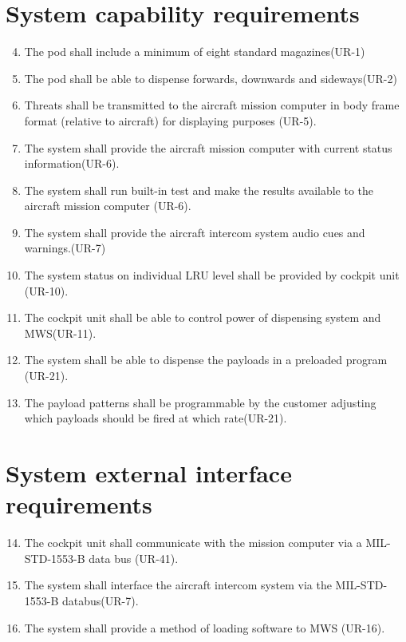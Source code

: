 \documentclass[Main]{subfiles}
\begin{document}
\section{System capability requirements}
\begin{enumerate}[{SR}-1]
\setcounter{enumi}{3}
\item The pod shall include a minimum of eight standard magazines(UR-1)\label{SR-4}

\item The pod shall be able to dispense forwards, downwards and sideways(UR-2) \label{SR-5}

\item Threats shall be transmitted to the aircraft mission computer in body frame format (relative to aircraft) for displaying purposes (UR-5).\label{SR-6}

\item The system shall provide the aircraft mission computer with current status information(UR-6).\label{SR-7}

\item The system shall run built-in test and make the results available to the aircraft mission computer (UR-6).\label{SR-8}

\item The system shall provide the aircraft intercom system audio cues and warnings.(UR-7)\label{SR-9}

\item The system status on individual LRU level shall be provided by cockpit unit (UR-10).\label{SR-10}

\item The cockpit unit shall be able to control power of dispensing system and MWS(UR-11).\label{SR-11}

\item The system shall be able to dispense the payloads in a preloaded program (UR-21). \label{SR-12}

\item The payload patterns shall be programmable by the customer adjusting which payloads should be fired at which rate(UR-21).\label{SR-13}
\end{enumerate}

\section{System external interface requirements}

\begin{enumerate}[{SR}-1]
\setcounter{enumi}{13}
\item The cockpit unit shall communicate with the mission computer via a MIL-STD-1553-B data bus (UR-41).\label{SR-14}

\item The system shall interface the aircraft intercom system via the MIL-STD-1553-B databus(UR-7).\label{SR-15}

\item The system shall provide a method of loading software to MWS (UR-16).\label{SR-16}
\end{enumerate}
\end{document}
